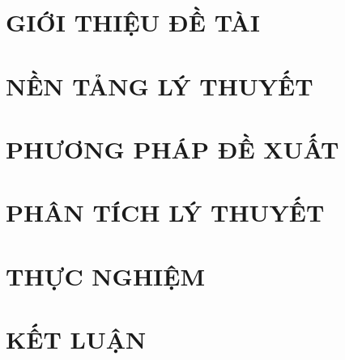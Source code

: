 \documentclass[a4paper,twoside]{report}
\theoremstyle{definition}
\begin{document}
\glsaddall
\renewcommand*{\acronymname}{DANH MỤC THUẬT NGỮ VÀ TỪ VIẾT TẮT}
\renewcommand*{\entryname}{Thuật ngữ}
\renewcommand*{\descriptionname}{Ý nghĩa}
\printnoidxglossary[type=\acronymtype]

\renewcommand{\figurename}{Hình}
\renewcommand{\tablename}{Bảng}
\renewcommand{\chaptername}{CHƯƠNG}


\newpage
{}

\pagestyle{fancy}
\fancyhf{}
\fancyhead[RE, LO]{\leftmark}
\fancyfoot[RE, LO]{\thepage}

\chapter{GIỚI THIỆU ĐỀ TÀI}

\newpage
\chapter{NỀN TẢNG LÝ THUYẾT}


\newpage
\chapter{PHƯƠNG PHÁP ĐỀ XUẤT}


\newpage
\chapter{PHÂN TÍCH LÝ THUYẾT}


\newpage
\chapter{THỰC NGHIỆM}


\newpage
\chapter{KẾT LUẬN}


\newpage
\renewcommand\bibname{TÀI LIỆU THAM KHẢO}
\printbibliography
{}
\end{document}
